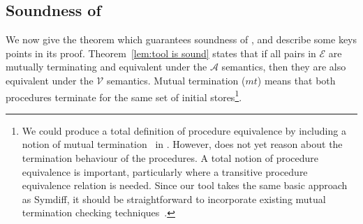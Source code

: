 \documentclass[runningheads,a4paper]{llncs}
\newcommand*{\equivmap}{\mathcal{E}}
\newcommand*{\muttermname}{\mathit{mt}}
\newcommand*\Asemantics{\mathcal{A}}
\newcommand*\asemantics{$\Asemantics$ semantics}
\newcommand*\Vsemantics{\mathcal{V}}
\newcommand*\vsemantics{$\Vsemantics$ semantics}
\begin{document}
\subsection{Soundness of \metho{}}

We now give the theorem which guarantees soundness of \metho{}, and describe some keys points in its proof. Theorem~\ref{lem:tool is sound} states that if all pairs in $\equivmap$ are mutually terminating and equivalent under the \asemantics{}, then they are also equivalent under the \vsemantics{}. Mutual termination ($\muttermname$) means that both procedures terminate for the same set of initial stores\footnote{We could produce a total definition of procedure equivalence by including a notion of mutual termination~\cite{Hawblitzel2013,Elenbogen2015} in . However, \tool{} does not yet reason about the termination behaviour of the procedures. A total notion of procedure equivalence is important, particularly where a transitive procedure equivalence relation is needed. Since our tool takes the same basic approach as Symdiff, it should be straightforward to incorporate existing mutual termination checking techniques~\cite{Godlin08,Hawblitzel2013,Elenbogen2015}.}.
\end{document}
